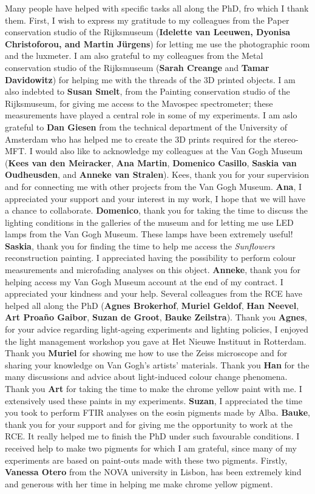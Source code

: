 Many people have helped with specific tasks all along the PhD, fro which I thank them. First, I wish to express my gratitude to my colleagues from the Paper conservation studio of the Rijksmuseum (\textbf{Idelette van Leeuwen, Dyonisa Christoforou, and Martin Jürgens}) for letting me use the photographic room and the luxmeter. I am also grateful to my colleagues from the Metal conservation studio of the Rijksmuseum (\textbf{Sarah Creange} and \textbf{Tamar Davidowitz}) for helping me with the threads of the 3D printed objects. I am also indebted to \textbf{Susan Smelt}, from the Painting conservation studio of the Rijksmuseum, for giving me access to the Mavospec spectrometer; these measurements have played a central role in some of my experiments. I am aslo grateful to \textbf{Dan Giesen} from the technical department of the University of Amsterdam who has helped me to create the 3D prints required for the stereo-MFT. I would also like to acknowledge my colleagues at the Van Gogh Museum (\textbf{Kees van den Meiracker}, \textbf{Ana Martin}, \textbf{Domenico Casillo}, \textbf{Saskia van Oudheusden}, and \textbf{Anneke van Stralen}). Kees, thank you for your supervision and for connecting me with other projects from the Van Gogh Museum. \textbf{Ana}, I appreciated your support and your interest in my work, I hope that we will have a chance to collaborate. \textbf{Domenico}, thank you for taking the time to discuss the lighting conditions in the galleries of the museum and for letting me use LED lamps from the Van Gogh Museum. These lamps have been extremely useful! \textbf{Saskia}, thank you for finding the time to help me access the \textit{Sunflowers} reconstruction painting. I appreciated having the possibility to perform colour measurements and microfading analyses on this object. \textbf{Anneke}, thank you for helping access my Van Gogh Museum account at the end of my contract. I appreciated your kindness and your help. Several colleagues from the \gls{RCE} have helped all along the PhD (\textbf{Agnes Brokerhof}, \textbf{Muriel Geldof}, \textbf{Han Neevel}, \textbf{Art Proa\~{n}o Gaibor}, \textbf{Suzan de Groot}, \textbf{Bauke Zeilstra}). Thank you \textbf{Agnes}, for your advice regarding light-ageing experiments and lighting policies, I enjoyed the light management workshop you gave at Het Nieuwe Instituut in Rotterdam. Thank you \textbf{Muriel} for showing me how to use the Zeiss microscope and for sharing your knowledge on Van Gogh's artists' materials. Thank you \textbf{Han} for the many discussions and advice about light-induced colour change phenomena. Thank you \textbf{Art} for taking the time to make the chrome yellow paint with me. I extensively used these paints in my experiments. \textbf{Suzan}, I appreciated the time you took to perform FTIR analyses on the eosin pigments made by Alba. \textbf{Bauke}, thank you for your support and for giving me the opportunity to work at the \gls{RCE}. It really helped me to finish the PhD under such favourable conditions.  I received help to make two pigments for which I am grateful, since many of my experiments are based on paint-outs made with these two pigments. Firstly, \textbf{Vanessa Otero} from the NOVA university in Lisbon, has been extremely kind and generous with her time in helping me make chrome yellow pigment. 